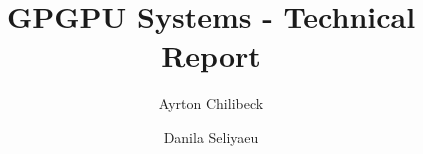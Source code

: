 



\title{GPGPU Systems - Technical Report}
\author[1]{Ayrton Chilibeck}
\author[1]{Danila Seliyaeu}



\maketitle

\vspace{2ex}








\printbibliography

